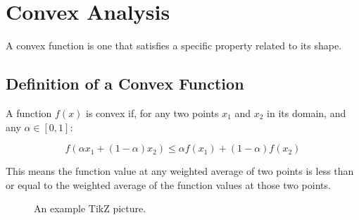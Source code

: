 \chapter{Convex Analysis}

A convex function is one that satisfies a specific property related to its shape.

\section{Definition of a Convex Function}
A function \( f(x) \) is convex if, for any two points \( x_1 \) and \( x_2 \) in its domain,
and any \( \alpha \in [0, 1] \):

\begin{equation}
f(\alpha x_1 + (1 - \alpha) x_2) \leq \alpha f(x_1) + (1 - \alpha) f(x_2)
\end{equation}

This means the function value at any weighted average of two points is less than or equal to the weighted average of
the function values at those two points.

\begin{figure}[h!]
    \centering
\caption{An example TikZ picture.}
    \label{fig:tikz_example}
\end{figure}







\nocite{*}

